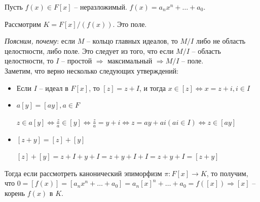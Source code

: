 Пусть $f(x) \in F[x]$ -- неразложимый. $f(x) = a_nx^n + \ldots + a_0$.

Рассмотрим $K = F[x]/(f(x))$. Это поле.

\textit{Поясним, почему}: если $M$ -- кольцо главных идеалов, то $M/I$ либо не область целостности, либо поле. Это следует из того, что если $M/I$ -- область целостности, то $I$ -- простой $\Rightarrow$ максимальный $\Rightarrow M/I$ -- поле.\\

Заметим, что верно несколько следующих утверждений:

\begin{itemize}
    \item Если $I$ -- идеал в $F[x]$, то $[z] = z + I$, и тогда $x \in [z] \Leftrightarrow x = z + i, i \in I$
    \item $a[y] = [ay], a \in F$
    
    \Proof
    $z \in a[y] \Leftrightarrow \frac{z}{a} \in [y] \Leftrightarrow \frac{z}{a} = y + i \Leftrightarrow z = ay + ai (ai \in I) \Leftrightarrow z \in [ay]$
    \EndProof
    
    \item $[z + y] = [z] + [y]$
    
    \Proof
    $[z] + [y] = z + I + y + I = z + y + I + I = z + y + I = [z + y]$    
    \EndProof
\end{itemize}

Тогда если рассмотреть канонический эпиморфизм $\pi : F[x] \to K$, то получим, что $0 = [f(x)] = [a_nx^n + \ldots + a_0] = a_n[x]^n + \ldots + a_0 = f([x]) \Rightarrow [x]$ -- корень $f(x)$ в $K$. 